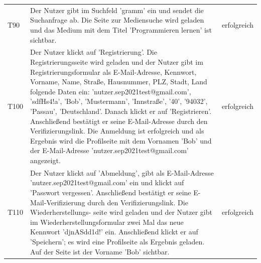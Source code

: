 \documentclass{article}
\begin{document}
\begin{table}[H]
\begin{tabular}{ p{3em} p{32em} p{5em} }
        T90 & Der Nutzer gibt im Suchfeld ’gramm’ ein und sendet die Suchanfrage ab. Die Seite zur Mediensuche wird geladen und das Medium mit dem Titel ’Programmieren
        lernen’ ist sichtbar. & erfolgreich\\
        T100 & Der Nutzer klickt auf ’Registrierung’. Die Registrierungsseite wird geladen und der Nutzer gibt im Registrierungsformular als E-Mail-Adresse, Kennwort, Vorname, Name, Straße, Hausnummer, PLZ, Stadt, Land folgende Daten ein: ’nutzer.sep2021test@gmail.com’, ’sdfHs4!a’, ’Bob’, ’Mustermann’, ’Innstraße’, ’40’, ’94032’, ’Passau’, ’Deutschland’. Danach klickt er auf ’Registrieren’. Anschließend bestätigt er seine E-Mail-Adresse durch den Verifizierungslink. Die Anmeldung ist erfolgreich und als Ergebnis wird die Profilseite mit dem Vornamen ’Bob’ und der E-Mail-Adresse ’nutzer.sep2021test@gmail.com’ angezeigt. & erfolgreich\\
        T110 & Der Nutzer klickt auf ’Abmeldung’, gibt als E-Mail-Adresse ’nutzer.sep2021test@gmail.com’ ein und klickt auf ’Passwort vergessen’. Anschließend bestätigt er seine E-Mail-Verifizierung durch den Verifizierungslink. Die Wiederherstellungs- seite wird geladen und der Nutzer gibt im Wiederherstellungsformular zwei Mal das neue Kennwort ’djnASdd1d!’ ein. Anschließend klickt er auf ’Speichern’; es wird eine Profilseite als Ergebnis geladen. Auf der Seite ist der Vorname ’Bob’ sichtbar. & erfolgreich\\
        \bottomrule
    \end{tabular}
\end{table}
\end{document}
